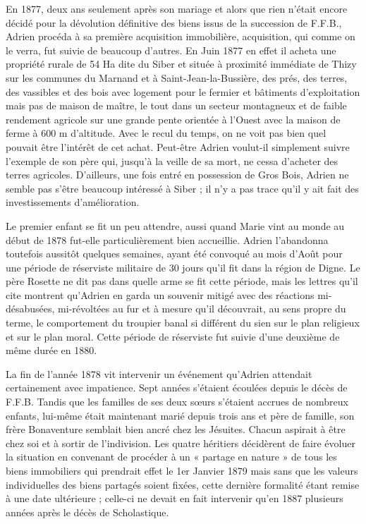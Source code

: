 \documentclass[11pt,a4paper]{report}
\begin{document}
En 1877, deux ans seulement après son mariage et alors que rien n'était encore décidé pour la dévolution définitive des biens issus de la succession de F.F.B., Adrien procéda à sa première acquisition immobilière, acquisition, qui comme on le verra, fut suivie de beaucoup d'autres. En Juin 1877 en effet il acheta une propriété rurale de 54 Ha dite du Siber et située à proximité immédiate de Thizy sur les communes du Marnand et à Saint-Jean-la-Bussière, des prés, des terres, des vassibles et des bois avec logement pour le fermier et bâtiments d'exploitation mais pas de maison de maître, le tout dans un secteur montagneux et de faible rendement agricole sur une grande pente orientée à l'Ouest avec la maison de ferme à 600 m d'altitude. Avec le recul du temps, on ne voit pas bien quel pouvait être l'intérêt de cet achat. Peut-être Adrien voulut-il simplement suivre l'exemple de son père qui, jusqu'à la veille de sa mort, ne cessa d'acheter des terres agricoles. D'ailleurs, une fois entré en possession de Gros Bois, Adrien ne semble pas s'être beaucoup intéressé à Siber ; il n'y a pas trace qu'il y ait fait des investissements d'amélioration.

Le premier enfant se fit un peu attendre, aussi quand Marie vint au monde au début de 1878 fut-elle particulièrement bien accueillie. Adrien l'abandonna toutefois aussitôt quelques semaines, ayant été convoqué au mois d'Août pour une période de réserviste militaire de 30 jours qu'il fit dans la région de Digne. Le père Rosette ne dit pas dans quelle arme se fit cette période, mais les lettres qu'il cite montrent qu'Adrien en garda un souvenir mitigé avec des réactions mi-désabusées, mi-révoltées au fur et à mesure qu'il découvrait, au sens propre du terme, le comportement du troupier banal si différent du sien sur le plan religieux et sur le plan moral. Cette période de réserviste fut suivie d'une deuxième de même durée en 1880.


La fin de l'année 1878 vit intervenir un événement qu'Adrien attendait certainement avec impatience. Sept années s'étaient écoulées depuis le décès de F.F.B. Tandis que les familles de ses deux sœurs s'étaient accrues de nombreux enfants, lui-même était maintenant marié depuis trois ans et père de famille, son frère Bonaventure semblait bien ancré chez les Jésuites. Chacun aspirait à être chez soi et à sortir de l'indivision. Les quatre héritiers décidèrent de faire évoluer la situation en convenant de procéder à un « partage en nature » de tous les biens immobiliers qui prendrait effet le 1er Janvier 1879 mais sans que les valeurs individuelles des biens partagés soient fixées, cette dernière formalité étant remise à une date ultérieure ; celle-ci ne devait en fait intervenir qu'en 1887 plusieurs années après le décès de Scholastique.
\end{document}
